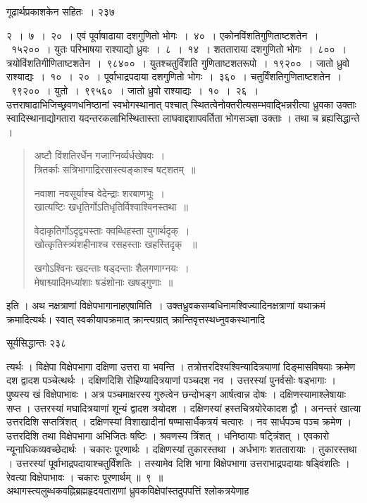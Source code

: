 \documentclass[11pt, openany]{book}
\begin{document}
\newpage

\hspace{3cm} गूढार्थप्रकाशकेन सहितः~। \hfill २३७ 
\vspace{1cm}


\noindent २~।~७~।~२०~। एवं पूर्वाषाढाया दशगुणितो भोगः~।~४०~। एकोनविंशतिगुणिताष्टशतेन~।~१५२००~। युतः परिभाषया राश्याद्यो ध्रुवः~।~८~।~१४~। शतताराया दशगुणितो भोगः~।~८००~। त्रयोविंशतिगीणिताष्टशतेन~।~९८४००~। युतश्चतुर्विंशति गुणिताष्टशतरूपो~।~१९२००~। जातो ध्रुवो राश्याद्यः~।~१०~।~२०~। पूर्वाभाद्रपदाया दशगुणितो भोगः~।~३६०~। चतुर्विंशतिगुणिताष्टशतेन~।~९९२००~। युतो~।~९९५६०~। जातो ध्रुवो राश्याद्यः~।~१०~।~२६~। उत्तराषाढाभिजिच्छ्रवणधनिष्ठानां स्वभोगस्थानात् पश्चात् स्थितत्वेनोक्तरीत्यसम्भवाद्भिन्नरीत्या ध्रुवका उक्ताः स्वादिस्थानाद्योगतारा यदन्तरकलाभिस्थितास्ता लाघवाद्दशापवर्तिता भोगसञ्ज्ञा उक्ताः । तथा च ब्रह्यसिद्धान्ते ।


\begin{quote}
{\qt अष्टौ विंशतिरर्धेन गजाग्निर्व्यर्धखेषवः~।\\
त्रितर्काः सत्रिभागाद्रिरसास्त्यङ्काश्च षट्शतम्~॥

नवाशा नवसूर्याश्च वेदेन्द्राः शरबाणभूः~।\\
खात्यष्टिः खधृतिर्गोऽतिधृतिर्विश्वाश्विनस्तथा~॥

वेदाकृतिर्गोऽदृद्व्यस्ताः क्वब्धिहस्ता युगार्थदृक्~।\\
खोत्कृतिस्त्र्यंशहीनाश्च रसहस्ताः खहस्तिदृक् ~॥

खगोऽश्विनः खदन्ताः षड्दन्ताः शैलगणाग्नयः~।\\
मेषाश्व्यादिमध्यांशाः षडंशोनाः खषड्गुणाः~॥}
\end{quote}

इति । अथ नक्षत्राणां विक्षेपभागानाह\textendash एषामिति~। उक्तध्रुवकसम्बधिनामश्विज्यादिनक्षत्राणां यथाक्रमं क्रमादित्यर्थः। स्वात् स्वकीयापक्रमात् क्रान्त्यग्रात् क्रान्तिवृत्तस्थध्नुवकस्थानादि \textendash


\newpage

 \hspace{4cm} सूर्यसिद्धान्तः \hfill २३८
\vspace{1cm}


\noindent त्यर्थः । विक्षेपा विक्षेपभागा दक्षिणा उत्तरा वा भवन्ति । तत्रोत्तरदिश्यश्विन्यादित्रयाणां दिङ्मासविषयाः क्रमेण दश द्वादश पञ्चेत्थर्थः । दक्षिणदिशि रोहिण्यादित्रयाणां पञ्चदश नव । उत्तरस्यां पुनर्वसोः षड्भागाः । पुष्यस्य खं विक्षेपाभावः । अत्र पञ्चमाक्षरस्य गुरुत्वेन छन्दोभङ्ग आर्षत्वान्न दोषः । दक्षिणस्यामाश्लेषायाः सप्त । उत्तरस्यां मघादित्रयाणां शून्यं द्वादश त्रयोदश । दक्षिणस्यां हस्तचित्रयोरेकादश द्वौ । अनन्तरं खात्या उत्तरदिशि सप्तत्रिंशत् । दक्षिणस्यां विशाखादीनां षण्मासार्धैकत्रयं चत्वारः । नव सार्धपञ्च पञ्च क्रमेण । उत्तरदिशि तथा विक्षेपभागा अभिजितः षष्टिः । श्रवणस्य त्रिंशत् । धनिष्ठायाः षट्त्रिंशत् । एवकारो न्यूनाधिकव्यवच्छेदार्थः । चकारः पूरणार्थः । दक्षिणस्यां तुकारस्तथा । अर्धभागः शततारायाः । तुकारस्तथा । उत्तरस्यां पूर्वाभाद्रपदायाश्चतुर्विंशतिः । तस्यामेव दिशि भागा विक्षेपभागा उत्तराभाद्रपदायाः षड्विंशतिः । रेवत्या विक्षेपाभावः । चकारः पूरणार्थम् ॥~९~॥\\
\noindent अथागस्त्यलुब्धकवह्निब्रह्महृदयताराणां ध्रुवकविक्षेपांस्तदुपपत्तिं श्लोकत्रयेणाह \textendash
\end{document}
